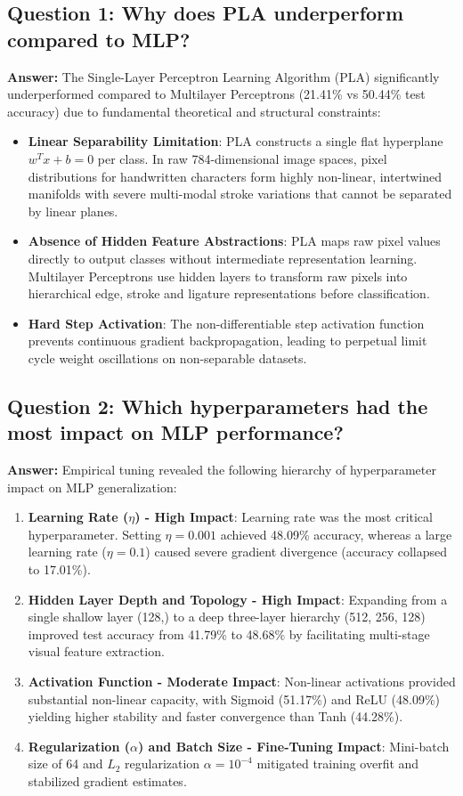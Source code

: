 \documentclass[12pt,a4paper]{article}
\begin{document}
\subsection*{Question 1: Why does PLA underperform compared to MLP?}
\textbf{Answer:}
The Single-Layer Perceptron Learning Algorithm (PLA) significantly underperformed compared to Multilayer Perceptrons (21.41\% vs 50.44\% test accuracy) due to fundamental theoretical and structural constraints:
\begin{itemize}
\item \textbf{Linear Separability Limitation}: PLA constructs a single flat hyperplane $w^T x + b = 0$ per class. In raw 784-dimensional image spaces, pixel distributions for handwritten characters form highly non-linear, intertwined manifolds with severe multi-modal stroke variations that cannot be separated by linear planes.
\item \textbf{Absence of Hidden Feature Abstractions}: PLA maps raw pixel values directly to output classes without intermediate representation learning. Multilayer Perceptrons use hidden layers to transform raw pixels into hierarchical edge, stroke and ligature representations before classification.
\item \textbf{Hard Step Activation}: The non-differentiable step activation function prevents continuous gradient backpropagation, leading to perpetual limit cycle weight oscillations on non-separable datasets.
\end{itemize}

\subsection*{Question 2: Which hyperparameters had the most impact on MLP performance?}
\textbf{Answer:}
Empirical tuning revealed the following hierarchy of hyperparameter impact on MLP generalization:
\begin{enumerate}
\item \textbf{Learning Rate ($\eta$) - High Impact}: Learning rate was the most critical hyperparameter. Setting $\eta = 0.001$ achieved 48.09\% accuracy, whereas a large learning rate ($\eta = 0.1$) caused severe gradient divergence (accuracy collapsed to 17.01\%).
\item \textbf{Hidden Layer Depth and Topology - High Impact}: Expanding from a single shallow layer (128,) to a deep three-layer hierarchy (512, 256, 128) improved test accuracy from 41.79\% to 48.68\% by facilitating multi-stage visual feature extraction.
\item \textbf{Activation Function - Moderate Impact}: Non-linear activations provided substantial non-linear capacity, with Sigmoid (51.17\%) and ReLU (48.09\%) yielding higher stability and faster convergence than Tanh (44.28\%).
\item \textbf{Regularization ($\alpha$) and Batch Size - Fine-Tuning Impact}: Mini-batch size of 64 and $L_2$ regularization $\alpha = 10^{-4}$ mitigated training overfit and stabilized gradient estimates.
\end{enumerate}
\end{document}
